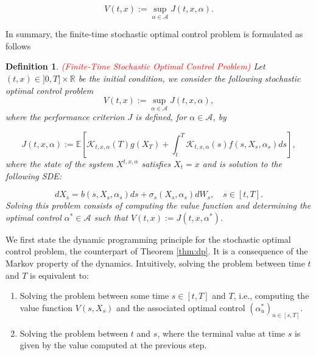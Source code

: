 \documentclass{article}
\newtheorem{definition}{Definition}
\begin{document}
\begin{equation*} 
V(t,x):=\sup_{\alpha\in\mathcal{A}}J(t,x,\alpha).
\end{equation*}

In summary, the finite-time stochastic optimal control problem is formulated as follows

\begin{definition} \textcolor{red}{(Finite-Time Stochastic Optimal Control Problem)}
Let $(t,x)\in]0,T]\times\mathbb{R}$ be the initial condition, we consider the following stochastic optimal control problem
\begin{equation} \label{soc:value_fcn}
V(t,x):=\sup_{\alpha\in\mathcal{A}}J(t,x,\alpha),
\end{equation}
where the performance criterion $J$ is defined, for $\alpha\in\mathcal{A}$, by

\begin{equation*}
J(t,x,\alpha):=\mathbb{E}\left[\mathcal{K}_{t,x,\alpha}(T)g(X_T)+\int^T_t\mathcal{K}_{t,x,\alpha}(s)f(s,X_s,\alpha_s)ds\right],
\end{equation*}
where the state of the system $X^{t,x,\alpha}$ satisfies $X_t=x$ and is solution to the following SDE:

\begin{equation} \label{sde_control}
dX_s = b(s,X_s,\alpha_s)ds + \sigma_s(X_s,\alpha_s)dW_s, \quad s\in[t,T].
\end{equation}
Solving this problem consists of computing the value function and determining the optimal control $\alpha^*\in\mathcal{A}$ such that $V(t,x):=J(t,x,\alpha^*)$. 
\end{definition}

We first state the dynamic programming principle for the stochastic optimal control problem, the counterpart of Theorem \ref{thm:dp}. It is a consequence of the Markov property of the dynamics. Intuitively, solving the problem between time $t$ and $T$ is equivalent to:

\begin{enumerate}
\item
Solving the problem between some time $s\in[t,T]$ and $T$, i.e., computing the value function $V(s,X_s)$ and the associated optimal control $(\alpha^*_u)_{u\in[s,T]}$.

\item
Solving the problem between $t$ and $s$, where the terminal value at time $s$ is given by the value computed at the previous step. 
\end{enumerate}
\end{document}
